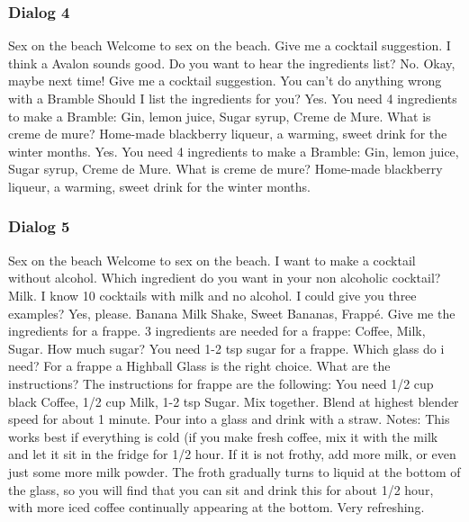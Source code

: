 \documentclass[12pt,letterpaper]{article}
\begin{document}
\subsubsection{Dialog 4}
\begin{dialogue}
	 Sex on the beach
	 Welcome to sex on the beach.
	 Give me a cocktail suggestion.
	 I think a Avalon sounds good. Do you want to hear the ingredients list?
	 No.
	 Okay, maybe next time!
	 Give me a cocktail suggestion.
	 You can't do anything wrong with a Bramble Should I list the ingredients for you?
	 Yes.
	 You need 4 ingredients to make a Bramble: Gin, lemon juice, Sugar syrup, Creme de Mure.
	 What is creme de mure?
	 Home-made blackberry liqueur, a warming, sweet drink for the winter months.
	 Yes.
	 You need 4 ingredients to make a Bramble: Gin, lemon juice, Sugar syrup, Creme de Mure.
	 What is creme de mure?
	 Home-made blackberry liqueur, a warming, sweet drink for the winter months.
	
\end{dialogue}
\subsubsection{Dialog 5}
\begin{dialogue}
	 Sex on the beach
	 Welcome to sex on the beach.
	 I want to make a cocktail without alcohol.
	 Which ingredient do you want in your non alcoholic cocktail?
	 Milk.
	 I know 10 cocktails with milk and no alcohol. I could give you three examples?
	 Yes, please.
	 Banana Milk Shake, Sweet Bananas, Frappé.
	 Give me the ingredients for a frappe.
	 3 ingredients are needed for a frappe: Coffee, Milk, Sugar.
	 How much sugar?
	 You need 1-2 tsp sugar for a frappe.
	 Which glass do i need?
	 For a frappe a Highball Glass is the right choice.
	 What are the instructions?
	 The instructions for frappe are the following: You need 1/2 cup black Coffee, 1/2 cup Milk, 1-2 tsp Sugar. Mix together. Blend at highest blender speed for about 1 minute. Pour into a glass and drink with a straw. Notes: This works best if everything is cold (if you make fresh coffee, mix it with the milk and let it sit in the fridge for 1/2 hour. If it is not frothy, add more milk, or even just some more milk powder. The froth gradually turns to liquid at the bottom of the glass, so you will find that you can sit and drink this for about 1/2 hour, with more iced coffee continually appearing at the bottom. Very refreshing.
	
\end{dialogue}
\end{document}
